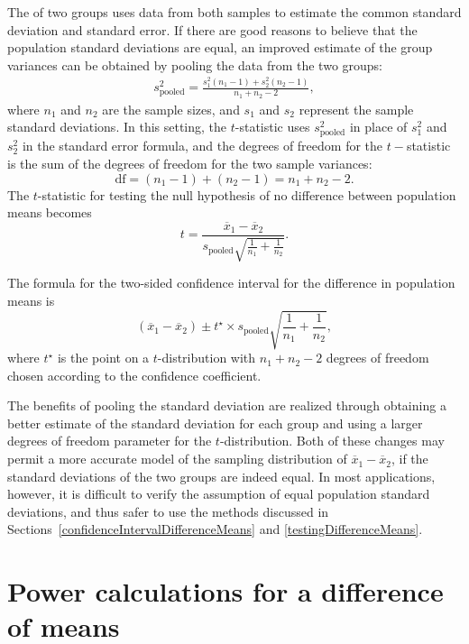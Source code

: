 The  of two groups uses data from both samples to estimate the common standard deviation and standard error. If there are good reasons to believe that the population standard deviations are equal, an improved estimate of the group variances can be obtained by pooling the data from the two groups:
\begin{align*}
s_{\text{pooled}}^2 = \frac{s_1^2 (n_1-1) + s_2^2 (n_2-1)}{n_1 + n_2 - 2},
\end{align*}
where $n_1$ and $n_2$ are the sample sizes, and $s_1$ and $s_2$ represent the sample standard deviations. In this setting, the $t$-statistic uses $s_{\text{pooled}}^2$ in place of $s_1^2$ and $s_2^2$ in the standard error formula, and the degrees of freedom for the $t-$statistic is the sum of the degrees of freedom for the two sample variances:
\[
\text{df} = (n_1 - 1) + (n_2 - 1) = n_1 + n_2 - 2.
\]
The $t$-statistic for testing the null hypothesis of no difference between population means becomes 
\[
 t = \frac{\overline{x}_1 - \overline{x}_2}{s_{\text{pooled}}\sqrt{\frac{1}{n_1} + \frac{1}{n_2}}}. 
\]

The formula for the two-sided confidence interval for the difference in population means is
\[
  (\overline{x}_1 - \overline{x}_2) \pm t^{\star} \times s_{\text{pooled}} \sqrt{\frac{1}{n_1} + \frac{1}{n_2}},
\]
where $t^{\star}$ is the point on a $t$-distribution with $n_1 + n_2 -2$ degrees of freedom chosen according to the confidence coefficient.

The benefits of pooling the standard deviation are realized through obtaining a better estimate of the standard deviation for each group and using a larger degrees of freedom parameter for the $t$-distribution. Both of these changes may permit a more accurate model of the sampling distribution of $\overline{x}_1 - \overline{x}_2$, if the standard deviations of the two groups are indeed equal.  In most applications, however, it is difficult to verify the assumption of equal population standard deviations, and thus safer to use the methods discussed in Sections~\ref{confidenceIntervalDifferenceMeans} and \ref{testingDifferenceMeans}.



\section[Power calculations for a difference of means]{Power calculations for a difference of means}
\label{PowerForDifferenceOfTwoMeans}

